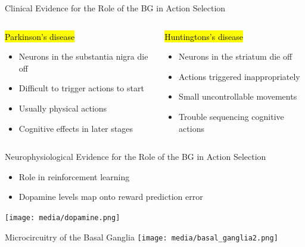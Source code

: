\documentclass[handout,aspectratio=169]{beamer}
\begin{document}
	\begin{frame}{Clinical Evidence for the Role of the BG in Action Selection}
		\begin{columns}[t]
			\begin{block}{\hl{Parkinson's disease}}
				\begin{itemize}			
					\setlength{\itemsep}{0.5cm}
					\item Neurons in the substantia nigra die off
					\item Difficult to trigger actions to start
					\item Usually physical actions
					\item Cognitive effects in later stages
				\end{itemize}
			\end{block}
			\begin{block}{\hl{Huntingtons's disease}}
				\begin{itemize}			
					\setlength{\itemsep}{0.5cm}
					\item Neurons in the striatum die off
					\item Actions triggered inappropriately
					\item Small uncontrollable movements
					\item Trouble sequencing cognitive actions					
				\end{itemize}
			\end{block}
		\end{columns}
	\end{frame}

	\begin{frame}{Neurophysiological Evidence for the Role of the BG in Action Selection}
		\begin{multicols}{2}
		\begin{itemize}
			\setlength{\itemsep}{0.25cm}
			\item Role in reinforcement learning
			\item Dopamine levels map onto reward prediction error
		\end{itemize}
		\end{multicols}
		\centering
		\texttt{[image: media/dopamine.png]}
	\end{frame}

	\begin{frame}{Microcircuitry of the Basal Ganglia}
		\centering
		\texttt{[image: media/basal\_ganglia2.png]}
	\end{frame}
\end{document}
